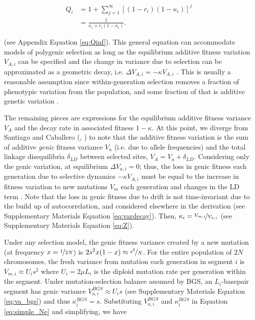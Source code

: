 \documentclass[11pt]{article}
\begin{document}
\begin{align}
    Q_i &= 1 + \sum_{j=1}^\infty \left[(1-r_i)(1-\kappa_i)\right]^j \\
        &= \frac{1}{\kappa_i + r_i(1-\kappa_i)}.
\end{align}

(see Appendix Equation \ref{eq:Qinf}). This general equation can accommodate
models of polygenic selection as long as the equilibrium additive fitness
variation $V_{A,i}$ can be specified and the change in variance due to
selection can be approximated as a geometric decay, i.e. $\Delta V_{A,i} =
-\kappa V_{A,i}$ \parencite{Bulmer1971-ae,Keightley1988-eq,Walsh2018-bt}. This
is usually a reasonable assumption since within-generation selection removes a
fraction of phenotypic variation from the population, and some fraction of that
is additive genetic variation \parencite{Bulmer1971-ae,Keightley1988-eq}.

The remaining pieces are expressions for the equilibrium additive fitness
variance $V_A$ and the decay rate in associated fitness $1-\kappa$. At this
point, we diverge from Santiago and Caballero (\citeyear{Santiago1998-bs},
\citeyear{Santiago2016-mu}) to note that the additive fitness variation is the
sum of additive \emph{genic} fitness variance $V_a$ (i.e. due to allele
frequencies) and the total linkage disequilibria $\delta_{LD}$ between selected
sites, $V_A = V_a + \delta_{LD}$. Considering only the genic variation, at
equilibrium $\Delta V_{a,i} = 0$; thus, the loss in genic fitness each
generation due to selective dynamics $-\kappa V_{A,i}$ must be equal to the
increase in fitness variation to new mutations $V_m$ each generation and
changes in the LD term \parencite{Bulmer1971-ae}. Note that the loss in genic
fitness due to drift is not time-invariant due to the build up of
autocorrelation, and considered elsewhere in the derivation (see Supplementary
Materials Equation \ref{eq:vardecay}). Then, $\kappa_i =
\nicefrac{V_{m,i}}{V_{a,i}}$ (see Supplementary Materials Equation \ref{eq:Z}). 

Under any selection model, the genic fitness variance created by a new mutation
(at frequency $x=\nicefrac{1}{2N}$) is $2s^2 x(1-x) \approx \nicefrac{s^2}{N}$.
For the entire population of $2N$ chromosomes, the fresh variance from mutation
each generation in segment $i$ is $V_{m,i} \approx U_is^2$ where $U_i = 2\mu
L_i$ is the diploid mutation rate per generation within the segment. Under
mutation-selection balance assumed by BGS, an $L_i$-basepair segment has genic
variance $V_{a,i}^{BGS} \approx U_i s$ (see Supplementary Materials Equation
\ref{eq:va_bgs}) and thus $\kappa_i^{BGS} = s$. Substituting $V_{a,i}^{BGS}$
and $\kappa_i^{BGS}$ in Equation \eqref{eq:simple_Ne} and simplifying, we have
\end{document}
